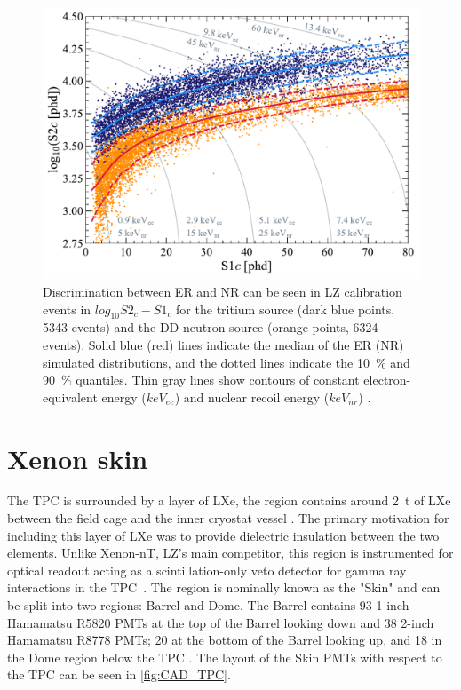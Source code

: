 \begin{figure}[ht!]
    \centering
    \includegraphics[width=0.7\linewidth]{figures/LZ/SR1WS_calOnly_0629.pdf}
    \caption{Discrimination between ER and NR can be seen in LZ calibration events in $log_{10}S2_{c}-S1_{c}$ for the tritium source (dark blue points, 5343 events) and the DD neutron source (orange points, 6324 events). Solid blue (red) lines indicate the median of the ER (NR) simulated distributions, and the dotted lines indicate the 10~\% and 90~\% quantiles. Thin gray lines show contours of constant electron-equivalent energy ($keV_{ee}$) and nuclear recoil energy ($keV_{nr}$) \cite{LZ:2022lsv}.}
    \label{fig:NRERBandExample}
\end{figure}

\section{Xenon skin}
The TPC is surrounded by a layer of LXe, the region contains around 2~t of LXe between the field cage and the inner cryostat vessel \cite{LZNIMA}. The primary motivation for including this layer of LXe was to provide dielectric insulation between the two elements. Unlike Xenon-nT, LZ's main competitor, this region is instrumented for optical readout acting as a scintillation-only veto detector for gamma ray interactions in the TPC~\cite{XENON:2024wpa}. The region is nominally known as the "Skin" and can be split into two regions: Barrel and Dome. The Barrel contains 93 1-inch Hamamatsu R5820 PMTs at the top of the Barrel looking down and 38 2-inch Hamamatsu R8778 PMTs; 20 at the bottom of the Barrel looking up, and 18 in the Dome region below the TPC \cite{LZNIMA}. The layout of the Skin PMTs with respect to the TPC can be seen in \autoref{fig:CAD_TPC}.

